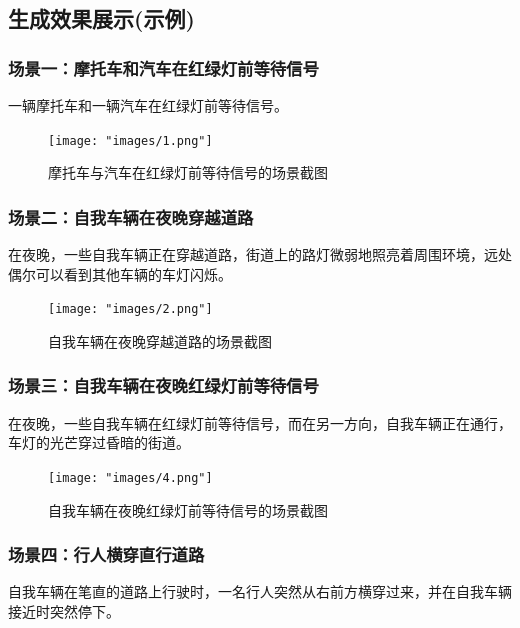 \documentclass{article}
\begin{document}
\subsection{生成效果展示(示例)}

\subsubsection{场景一：摩托车和汽车在红绿灯前等待信号}
\indent 一辆摩托车和一辆汽车在红绿灯前等待信号。\\

\begin{figure}[H]
	\centering
	\texttt{[image: "images/1.png"]}
	\caption{摩托车与汽车在红绿灯前等待信号的场景截图}
	\label{fig:redlight_motorbike_car}
\end{figure}

\subsubsection{场景二：自我车辆在夜晚穿越道路}
\indent 在夜晚，一些自我车辆正在穿越道路，街道上的路灯微弱地照亮着周围环境，远处偶尔可以看到其他车辆的车灯闪烁。\\

\begin{figure}[H]
	\centering
	\texttt{[image: "images/2.png"]}
	\caption{自我车辆在夜晚穿越道路的场景截图}
	\label{fig:night_self_driving_cross}
\end{figure}

\subsubsection{场景三：自我车辆在夜晚红绿灯前等待信号}
\indent 在夜晚，一些自我车辆在红绿灯前等待信号，而在另一方向，自我车辆正在通行，车灯的光芒穿过昏暗的街道。\\

\begin{figure}[H]
	\centering
	\texttt{[image: "images/4.png"]}
	\caption{自我车辆在夜晚红绿灯前等待信号的场景截图}
	\label{fig:night_redlight_cross}
\end{figure}

\subsubsection{场景四：行人横穿直行道路}
\indent 自我车辆在笔直的道路上行驶时，一名行人突然从右前方横穿过来，并在自我车辆接近时突然停下。\\
\end{document}
